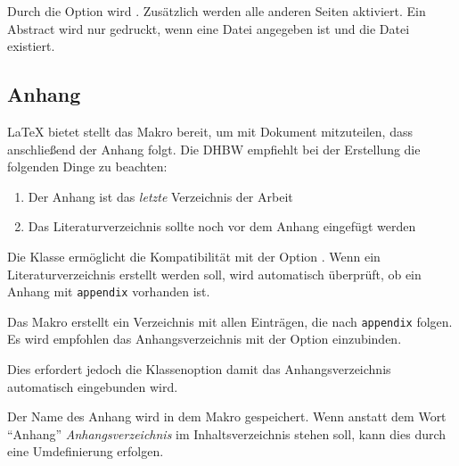 \documentclass[babel=ngerman,highlight=false]{skdoc}
\begin{document}
                Durch die Option wird . Zusätzlich werden alle anderen Seiten aktiviert. Ein Abstract wird nur gedruckt, wenn eine Datei angegeben ist und die Datei existiert.
                \medskip

        \subsection{Anhang}
            \LaTeX{} bietet stellt das Makro \Macro\appendix bereit, um mit Dokument mitzuteilen, dass anschließend der Anhang folgt. Die DHBW empfiehlt bei der Erstellung die folgenden Dinge zu beachten:

            \begin{enumerate}
                \item Der Anhang ist das \textit{letzte} Verzeichnis der Arbeit
                \item Das Literaturverzeichnis sollte noch vor dem Anhang eingefügt werden
            \end{enumerate}

            Die Klasse ermöglicht die Kompatibilität mit der Option . Wenn ein Literaturverzeichnis erstellt werden soll, wird automatisch überprüft, ob ein Anhang mit \verb|appendix| vorhanden ist.

            \DescribeMacro\listofappendices{} Das Makro erstellt ein Verzeichnis mit allen Einträgen, die nach \verb|appendix| folgen. Es wird empfohlen das Anhangsverzeichnis mit der Option  einzubinden.

            \begin{sourcecode}
            \end{sourcecode}

            Dies erfordert jedoch die Klassenoption  damit das Anhangsverzeichnis automatisch eingebunden wird.

            Der Name des Anhang wird in dem Makro  gespeichert. Wenn anstatt dem Wort \enquote{Anhang} \textit{Anhangsverzeichnis} im Inhaltsverzeichnis stehen soll, kann dies durch eine Umdefinierung erfolgen.
\end{document}
